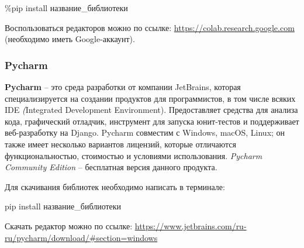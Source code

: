 \begin{center}
	\%pip install название\_библиотеки
\end{center}

Воспользоваться редакторов можно по ссылке: \url{https://colab.research.google.com} \\ (необходимо иметь Google-аккаунт).


\subsubsection{Pycharm}

\textbf{Pycharm} -- это среда разработки от компании JetBrains, которая специализируется на создании продуктов для программистов, в том числе всяких IDE \textit(Integrated Development Environment). Предоставляет средства для анализа кода, графический отладчик, инструмент для запуска юнит-тестов и поддерживает веб-разработку на Django. Pycharm совместим с Windows, macOS, Linux; он также имеет несколько вариантов лицензий, которые отличаются функциональностью, стоимостью и условиями использования. \textit{Pycharm Community Edition} -- бесплатная версия данного продукта.

Для скачивания библиотек необходимо написать в терминале:

\begin{center}
	pip install название\_библиотеки
\end{center}

Скачать редактор можно по ссылке: \url{https://www.jetbrains.com/ru-ru/pycharm/download/#section=windows}

\newpage
